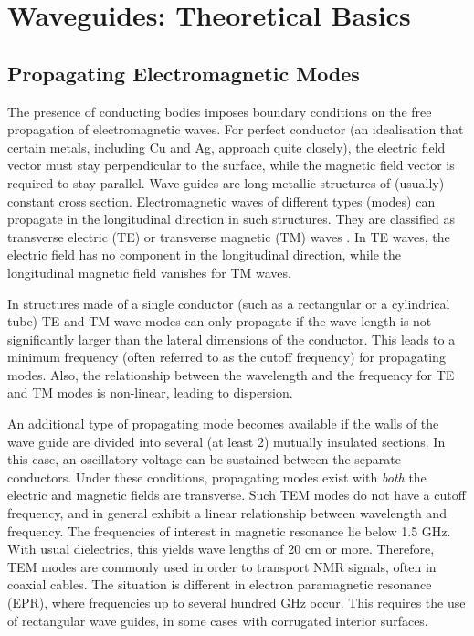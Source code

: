 \section{Waveguides: Theoretical Basics}\label{striplines-and-microslots-basics-and-theory}

\subsection{Propagating Electromagnetic Modes}\label{definition-of-a-stripline}

The presence of conducting bodies imposes boundary conditions on the
free propagation of electromagnetic waves. For perfect conductor (an
idealisation that certain metals, including Cu and Ag, approach quite
closely), the electric field vector must stay perpendicular to the
surface, while the magnetic field vector is required to stay parallel.
Wave guides are long metallic structures of (usually) constant cross
section. Electromagnetic waves of different types (modes) can propagate
in the longitudinal direction in such structures. They are classified as
transverse electric (TE) or transverse magnetic (TM) waves \cite{Pozar:2012to}. In TE waves,
the electric field has no component in the longitudinal direction, while
the longitudinal magnetic field vanishes for TM waves. 

In structures made of a single conductor (such as a rectangular or a cylindrical
tube) TE and TM
wave modes can only propagate if the wave length is not significantly larger
than the lateral dimensions of the conductor. This leads to a minimum frequency
(often referred to as the cutoff frequency) for propagating modes. Also,
the relationship between the wavelength and the frequency for TE and TM
modes is non-linear, leading to dispersion. 

An additional type of
propagating mode becomes available if the walls of the wave guide are
divided into several (at least 2) mutually insulated sections. In this
case, an oscillatory voltage can be sustained between the separate
conductors. Under these conditions, propagating modes exist with
\textit{both} the electric and magnetic fields are transverse. Such TEM
modes do not have a cutoff frequency, and in general exhibit a linear
relationship between wavelength and frequency. The frequencies of interest
in magnetic resonance lie below 1.5 GHz. With usual dielectrics, this
yields wave lengths of 20 cm or more. Therefore, TEM modes are commonly
used in order to transport NMR signals, often in coaxial cables. 
The situation
is  different in electron paramagnetic resonance (EPR), where frequencies up
to several hundred GHz occur. This requires the use of rectangular wave
guides, in some cases with corrugated interior surfaces. 

